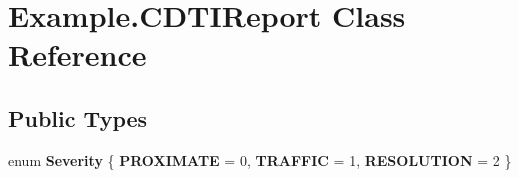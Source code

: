 \hypertarget{class_example_1_1_c_d_t_i_report}{}\section{Example.\+C\+D\+T\+I\+Report Class Reference}
\label{class_example_1_1_c_d_t_i_report}


 


\subsection*{Public Types}
\begin{DoxyCompactItemize}
\item 
enum {\bfseries Severity} \{ {\bfseries P\+R\+O\+X\+I\+M\+A\+TE} = 0, 
{\bfseries T\+R\+A\+F\+F\+IC} = 1, 
{\bfseries R\+E\+S\+O\+L\+U\+T\+I\+ON} = 2
 \}\hypertarget{class_example_1_1_c_d_t_i_report_a2e9a6b1d49e40e4ef91e4f51f7cb56be}{}\label{class_example_1_1_c_d_t_i_report_a2e9a6b1d49e40e4ef91e4f51f7cb56be}

\end{DoxyCompactItemize}
